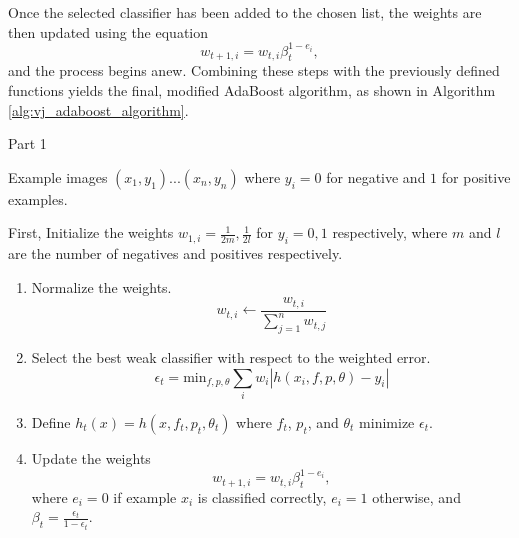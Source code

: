 \documentclass[11pt,a4paper,oldfontcommands]{memoir}
\begin{document}
Once the selected classifier has been added to the chosen list, the weights are then updated using the equation
\begin{equation}
    w_{t+1, i} = w_{t,i}\beta_t^{1-e_i},
\end{equation}
and the process begins anew. Combining these steps with the previously defined functions yields the final, modified AdaBoost algorithm, as shown in Algorithm \ref{alg:vj_adaboost_algorithm}.

\begin{algorithm}
    \caption{Part 1}
    \label{alg:vj_adaboost_algorithm}
    \begin{algorithmic}
        \addtocounter{algorithm}{-1}
        \Require Example images $(x_1, y_1) ... (x_n, y_n)$ where $y_i = 0$ for negative and $1$ for positive examples.\\
        \item First, Initialize the weights $w_{1,i}=\frac{1}{2m},\frac{1}{2l}$ for $y_i = 0, 1$ respectively, where $m$ and $l$ are the number of negatives and positives respectively.\\
            \begin{enumerate}
                \item \textrm{Normalize the weights.}
                \begin{equation}
                    w_{t,i} \leftarrow \frac{w_{t,i}}{\sum^n_{j=1} w_{t,j}}
                \end{equation}
                
                \item \textrm{Select the best weak classifier with respect to the weighted error.} 
                \begin{equation}
                    \epsilon_t = \textrm{min}_{f,p,\theta} \sum\limits_{i} w_i |  h(x_i, f, p, \theta) - y_i|
                \end{equation}
                
                \item Define $h_t(x) = h(x, f_t, p_t, \theta_t)$ where $f_t$, $p_t$, and $\theta_t$ minimize $\epsilon_t$. 
                
                \item Update the weights
                \begin{equation}
                    w_{t+1, i} = w_{t,i}\beta_t^{1-e_i},
                \end{equation}
                where $e_i = 0$ if example $x_i$ is classified correctly, $e_i = 1$ otherwise, and $\beta_t = \frac{\epsilon_t}{1-\epsilon_t}$.
            \end{enumerate}
        \EndFor\\\\
        

\end{algorithmic}
\end{algorithm}
\end{document}
